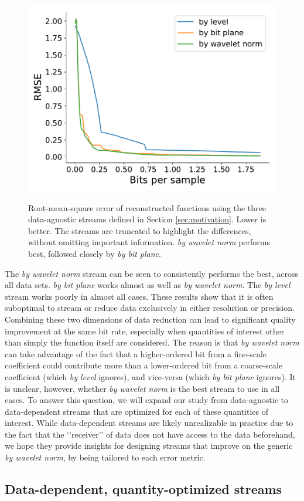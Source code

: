 \begin{figure}[h]
 	{\includegraphics[width=0.48\linewidth]{img/motivation/motivation-psnr-velocityz.pdf}}
 	\caption{Root-mean-square error of reconstructed functions using the three data-agnostic streams
 	defined in Section \ref{sec:motivation}. Lower is better. The streams are truncated to highlight
 	the differences, without omitting important information. \emph{by wavelet norm} performs best,
 	followed closely by \emph{by bit plane}.}
 	\label{fig:motivation-rmse}
\end{figure}

The \emph{by wavelet norm} stream can be seen to consistently performs the best, across all data
sets. \emph{by bit plane} works almost as well as \emph{by wavelet norm}. The \emph{by level} stream
works poorly in almost all cases. These results show that it is often suboptimal to stream or reduce
data exclusively in either resolution or precision. Combining these two dimensions of data reduction
can lead to significant quality improvement at the same bit rate, especially when quantities of
interest other than simply the function itself are considered. The reason is that \emph{by wavelet
norm} can take advantage of the fact that a higher-ordered bit from a fine-scale coefficient could
contribute more than a lower-ordered bit from a coarse-scale coefficient (which \emph{by level}
ignores), and vice-versa (which \emph{by bit plane} ignores). It is unclear, however, whether
\emph{by wavelet norm} is the best stream to use in all cases. To answer this question, we will
expand our study from data-agnostic to data-dependent streams that are optimized for each of these
quantities of interest. While data-dependent streams are likely unrealizable in practice due to the
fact that the `'receiver'' of data does not have access to the data beforehand, we hope they provide
insights for designing streams that improve on the generic \emph{by wavelet norm}, by being tailored
to each error metric.

\subsection{Data-dependent, quantity-optimized streams}
\label{sec:data_dep_streams}

